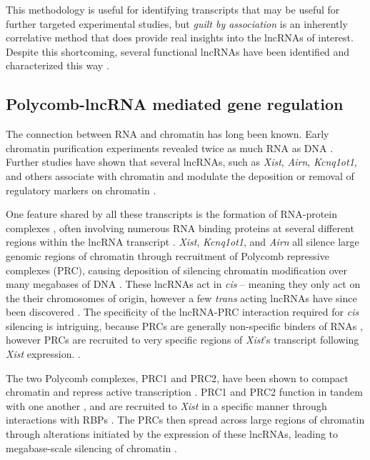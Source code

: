 This methodology is useful for identifying transcripts that may be useful for further targeted experimental studies, but \emph{guilt by association} is an inherently correlative method that does provide real insights into the lncRNAs of interest. Despite this shortcoming, several functional lncRNAs have been identified and characterized this way \cite{Gupta2010LongMetastasis, Broadbent2011ALncRNAs}. 


\subsection{Polycomb-lncRNA mediated gene regulation}

The connection between RNA and chromatin has long been known. Early chromatin purification experiments revealed twice as much RNA as DNA \cite{Paul1975Chromatin-associatedEuchromatin}. Further studies have shown that several lncRNAs, such as \emph{Xist}, \emph{Airn}, \emph{Kcnq1ot1}, and others associate with chromatin and modulate the deposition or removal of regulatory markers on chromatin \cite{Schertzer2019LncRNA-InducedDNA,Pandey2008Kcnq1ot1Regulation,Sleutels2002TheGenes}. 

One feature shared by all these transcripts is the formation of RNA-protein complexes \cite{Schertzer2019LncRNA-InducedDNA}, often involving numerous RNA binding proteins at several different regions within the lncRNA transcript \cite{Brockdorff2018LocalNcRNA,Nesterova2001CharacterizationSequence,Sprague2019NonlinearDomains,Pintacuda2017HnRNPKSilencing}.  \emph{Xist}, \emph{Kcnq1ot1}, and \emph{Airn} all silence large genomic regions of chromatin through recruitment of Polycomb repressive complexes (PRC), causing deposition of silencing chromatin modification over many megabases of DNA \cite{Schertzer2019LncRNA-InducedDNA}. These lncRNAs act in \emph{cis} -- meaning they only act on the their chromosomes of origin, however a few \emph{trans} acting lncRNAs have since been discovered \cite{Hacisuleyman2016FunctionLocus,Somarowthu2015HOTAIRStructure}. The specificity of the lncRNA-PRC interaction required for \emph{cis} silencing is intriguing, because PRCs are generally non-specific binders of RNAs \cite{Davidovich2015TowardRNA,Cifuentes-Rojas2014Regulatory2}, however PRCs are recruited to very specific regions of \emph{Xist}'s transcript following \emph{Xist} expression. \cite{Pintacuda2017HnRNPKSilencing,Wang2017TargetingGuanines,Zhao2008PolycombChromosome}.

The two Polycomb complexes, PRC1 and PRC2, have been shown to compact chromatin and repress active transcription \cite{Simon2009MechanismsUnknowns,Leeb2010PolycombGenes,Schertzer2019LncRNA-InducedDNA}. PRC1 and PRC2 function in tandem with one another \cite{Leeb2010PolycombGenes,Schertzer2019LncRNA-InducedDNA}, and are recruited to \emph{Xist} in a specific manner through interactions with RBPs \cite{Almeida2017PCGF3/5-PRC1Inactivation,Pintacuda2017HnRNPKSilencing}. The PRCs then spread across large regions of chromatin through alterations initiated by the expression of these lncRNAs, leading to megabase-scale silencing of chromatin \cite{Schertzer2019LncRNA-InducedDNA}. 

